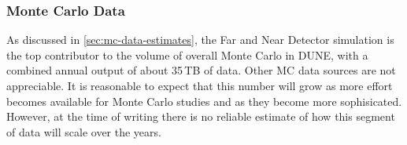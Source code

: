 

\subsubsection{Monte Carlo Data}
As discussed in \ref{sec:mc-data-estimates}, the Far and Near Detector simulation is the top contributor to the volume of overall
Monte Carlo in DUNE, with a combined annual output of about 35\,TB of data. Other MC data sources are not appreciable.
It is reasonable to expect that this number will grow as more effort becomes available for Monte Carlo studies and
as they become more sophisicated. However, at the time of writing there is no reliable estimate of how this segment of data
will scale over the years.



